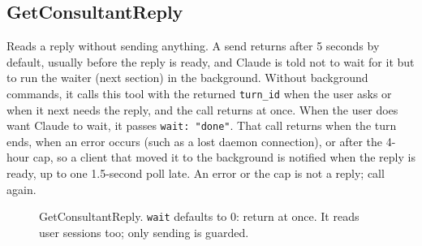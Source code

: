 \documentclass[10pt,a4paper]{article}
\newcommand{\lifelines}[2]{%
  \foreach \x/\name/\col in {#1} {%
    \node[actor, draw=\col, text=\col] at (\x,0) {\name};
    \draw[lifeline] (\x,-0.4) -- (\x,-#2);
  }}
\newcommand{\msg}[4]{\draw[call] (#2,-#1) -- node[above=1pt,lbl]{#4} (#3,-#1);}
\newcommand{\ret}[4]{\draw[reply] (#2,-#1) -- node[above=1pt,lbl]{#4} (#3,-#1);}
\newcommand{\frm}[5]{%
  \draw[gray, rounded corners=2pt] (#3,-#1) rectangle (#4,-#2);
  \node[anchor=north west, font=\scriptsize\sffamily\bfseries, text=gray, fill=white, inner sep=2pt] at (#3,-#1) {#5};}
\newcommand{\code}[1]{\texttt{#1}}
\begin{document}
\subsection{GetConsultantReply}

Reads a reply without sending anything. A send returns after 5 seconds by default, usually before
the reply is ready, and Claude is told not to wait for it but to run the waiter (next section) in
the background. Without background commands, it calls this tool with the returned
\code{turn\_id} when the user asks or when it next needs the reply, and the call returns at once.
When the user does want Claude to wait, it passes \code{wait: "done"}. That call returns when the turn ends, when an error occurs (such as a
lost daemon connection), or after the 4-hour cap, so a client that moved it to the background is
notified when the reply is ready, up to one 1.5-second poll late. An error or the cap is not a
reply; call again.

\begin{figure}[H]
\centering
{}
\caption{GetConsultantReply. \code{wait} defaults to 0: return at once. It reads user sessions too; only sending is guarded.}
\end{figure}
\end{document}
